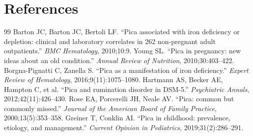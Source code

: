 \section*{References}
\begin{thebibliography}{99}
 Barton JC, Barton JC, Bertoli LF. ``Pica associated with iron deficiency or depletion: clinical and laboratory correlates in 262 non-pregnant adult outpatients.'' \textit{BMC Hematology}, 2010;10:9.
 Young SL. ``Pica in pregnancy: new ideas about an old condition.'' \textit{Annual Review of Nutrition}, 2010;30:403--422.
 Borgna-Pignatti C, Zanella S. ``Pica as a manifestation of iron deficiency.'' \textit{Expert Review of Hematology}, 2016;9(11):1075--1080.
 Hartmann AS, Becker AE, Hampton C, et al. ``Pica and rumination disorder in DSM-5.'' \textit{Psychiatric Annals}, 2012;42(11):426--430.
 Rose EA, Porcerelli JH, Neale AV. ``Pica: common but commonly missed.'' \textit{Journal of the American Board of Family Practice}, 2000;13(5):353--358.
 Greiner T, Conklin AI. ``Pica in childhood: prevalence, etiology, and management.'' \textit{Current Opinion in Pediatrics}, 2019;31(2):286--291.

\end{thebibliography}
